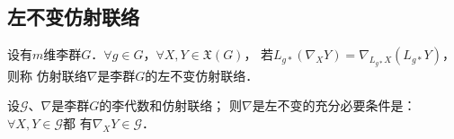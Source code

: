  

\subsection{左不变仿射联络}\label{chlg:sec_lic}

\begin{definition}\label{chlg:def_lic}
    设有$m$维李群$G$．$\forall g\in G$，$\forall X,Y\in \mathfrak{X}(G)$，
    若$L_{g*}(\nabla_X Y) = \nabla_{L_{g*}X}(L_{g*}Y)$，则称
    仿射联络$\nabla$是李群$G$的{\heiti 左不变仿射联络}．
\end{definition}

\begin{theorem}\label{chlg:thm_lic}
    设$\mathscr{G}$、$\nabla$是李群$G$的李代数和仿射联络；
    则$\nabla$是左不变的充分必要条件是：$\forall X,Y \in \mathscr{G}$都
    有$\nabla_X Y\in \mathscr{G}$．
\end{theorem}
